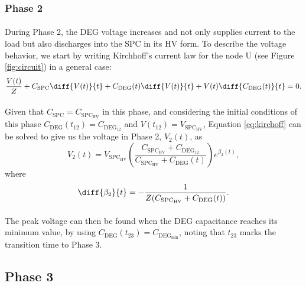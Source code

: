 \subsubsection{Phase 2}

\paragraph{} During Phase 2, the DEG voltage increases and not only supplies current to the load but also discharges into the SPC in its HV form. To describe the voltage behavior, we start by writing Kirchhoff's current law for the node U (see Figure \ref{fig:circuit}) in a general case:
\begin{equation}\label{eq:kirchoff}
 \frac{V(t)}{Z} + C_\text{SPC}\diff{V(t)}{t}+C_\text{DEG}(t)\diff{V(t)}{t}+V(t)\diff{C_\text{DEG}(t)}{t} = 0.
\end{equation}

\paragraph{} Given that $C_\text{SPC} =C_{\text{SPC}_\text{HV}}$ in this phase, and considering the initial conditions of this phase $C_\text{DEG}(t_{12}) = C_{\text{DEG}_{12}}$ and $V(t_{12}) = V_{\text{SPC}_\text{HV}}$, Equation \ref{eq:kirchoff} can be solved to give us the voltage in Phase 2, $V_2(t)$, as
\begin{equation}\label{eq:v2t}
V_2(t) = V_{\text{SPC}_\text{HV}}\left(\frac{C_{\text{SPC}_\text{HV}}+C_{\text{DEG}_{12}}}{C_{\text{SPC}_\text{HV}}+C_\text{DEG}(t)}\right)e^{\beta_2(t)},
\end{equation}
where
\begin{equation}
\diff{\beta_2}{t} = -\frac{1}{Z(C_{\text{SPC}_\text{HV}}+C_\text{DEG}(t))}.
\end{equation}

\paragraph{}The peak voltage can then be found when the DEG capacitance reaches its minimum value, by using $C_\text{DEG}(t_{23}) = C_{\text{DEG}_\text{min}}$, noting that $t_{23}$ marks the transition time to Phase 3.


\subsection{Phase 3}

